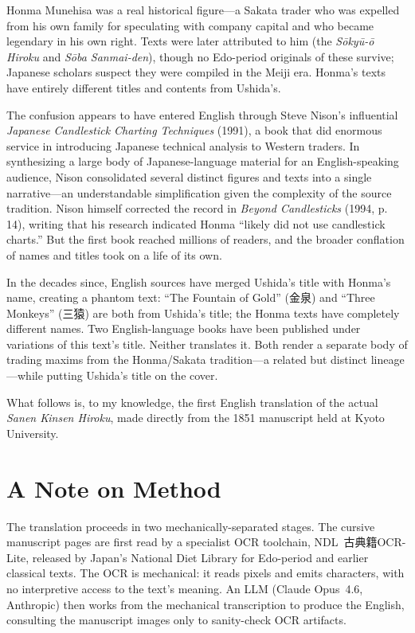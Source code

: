 \documentclass[10pt, openany]{book}
\newcommand{\jp}[1]{{\japanesefont #1}}
\begin{document}
Honma Munehisa was a real historical figure---a Sakata trader who was
expelled from his own family for speculating with company capital and who
became legendary in his own right. Texts were later attributed to him
(the \textit{S\=oky\=u-\=o Hiroku} and \textit{S\=oba Sanmai-den}),
though no Edo-period originals of these survive; Japanese scholars suspect
they were compiled in the Meiji era. Honma's texts have entirely different
titles and contents from Ushida's.

The confusion appears to have entered English through Steve Nison's
influential \textit{Japanese Candlestick Charting Techniques} (1991),
a book that did enormous service in introducing Japanese technical
analysis to Western traders. In synthesizing a large body of
Japanese-language material for an English-speaking audience, Nison
consolidated several distinct figures and texts into a single
narrative---an understandable simplification given the complexity of the
source tradition. Nison himself corrected the record in
\textit{Beyond Candlesticks} (1994, p.\,14), writing that his research
indicated Honma ``likely did not use candlestick charts.'' But the first
book reached millions of readers, and the broader conflation of names
and titles took on a life of its own.

In the decades since, English sources have merged Ushida's title with
Honma's name, creating a phantom text: ``The Fountain of Gold'' (\jp{金泉})
and ``Three Monkeys'' (\jp{三猿}) are both from Ushida's title; the Honma
texts have completely different names. Two English-language books have been
published under variations of this text's title. Neither translates it.
Both render a separate body of trading maxims from the Honma/Sakata
tradition---a related but distinct lineage---while putting Ushida's title
on the cover.

What follows is, to my knowledge, the first English translation of the
actual \textit{Sanen Kinsen Hiroku}, made directly from the 1851
manuscript held at Kyoto University.

\section*{A Note on Method}

\begin{sloppypar}
The translation proceeds in two mechanically-separated stages. The
cursive manuscript pages are first read by a specialist OCR
toolchain, NDL~\jp{古典籍OCR-Lite}, released by Japan's National
Diet Library for Edo-period and earlier classical texts. The OCR is
mechanical: it reads pixels and emits characters, with no
interpretive access to the text's meaning. An LLM (Claude
Opus~4.6, Anthropic) then works from the mechanical transcription
to produce the English, consulting the manuscript images only to
sanity-check OCR artifacts.
\end{sloppypar}
\end{document}
